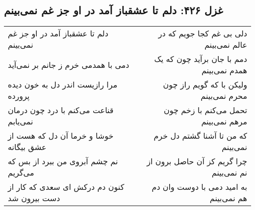 \begin{center}
\section*{غزل ۴۲۶: دلم تا عشقباز آمد در او جز غم نمی‌بینم}
\label{sec:426}
\begin{longtable}{l p{0.5cm} r}
دلم تا عشقباز آمد در او جز غم نمی‌بینم
&&
دلی بی غم کجا جویم که در عالم نمی‌بینم
\\
دمی با همدمی خرم ز جانم بر نمی‌آید
&&
دمم با جان برآید چون که یک همدم نمی‌بینم
\\
مرا رازیست اندر دل به خون دیده پرورده
&&
ولیکن با که گویم راز چون محرم نمی‌بینم
\\
قناعت می‌کنم با درد چون درمان نمی‌یابم
&&
تحمل می‌کنم با زخم چون مرهم نمی‌بینم
\\
خوشا و خرما آن دل که هست از عشق بیگانه
&&
که من تا آشنا گشتم دل خرم نمی‌بینم
\\
نم چشم آبروی من ببرد از بس که می‌گریم
&&
چرا گریم کز آن حاصل برون از نم نمی‌بینم
\\
کنون دم درکش ای سعدی که کار از دست بیرون شد
&&
به امید دمی با دوست وان دم هم نمی‌بینم
\\
\end{longtable}
\end{center}
